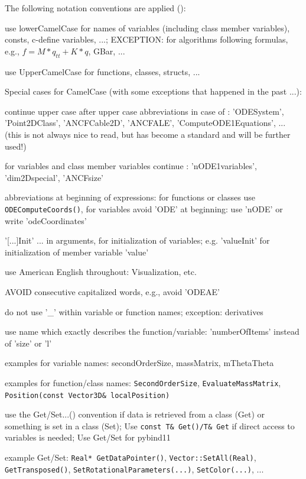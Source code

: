 %
The following notation conventions are applied ():
\bi
    \item use lowerCamelCase for names of variables (including class member variables), consts, c-define variables, ...; EXCEPTION: for algorithms following formulas, e.g., $f = M*q_{tt} + K*q$, GBar, ...
    \item use UpperCamelCase for functions, classes, structs, ...
    \item Special cases for CamelCase (with some exceptions that happened in the past ...): 
    \bi
    \item continue upper case after upper case abbreviations in case of : 'ODESystem', 'Point2DClass', 'ANCFCable2D', 'ANCFALE', 'ComputeODE1Equations', ... (this is not always nice to read, but has become a standard and will be further used!) 
    \item for variables and class member variables continue : 'nODE1variables', 'dim2Dspecial', 'ANCFsize'
    \item abbreviations at beginning of expressions: for functions or classes use \texttt{ODEComputeCoords()}, for variables avoid 'ODE' at beginning: use 'nODE' or write 'odeCoordinates'
    \ei
    \item '[...]Init' ... in arguments, for initialization of variables; e.g. 'valueInit' for initialization of member variable 'value'
    \item use American English throughout: Visualization, etc.
    \item AVOID consecutive capitalized words, e.g., avoid 'ODEAE'
    \item do not use '\_' within variable or function names; exception: derivatives
    \item use name which exactly describes the function/variable: 'numberOfItems' instead of 'size' or 'l'
    \item examples for variable names: secondOrderSize, massMatrix, mThetaTheta
    \item examples for function/class names: \texttt{SecondOrderSize}, \texttt{EvaluateMassMatrix}, \texttt{Position(const Vector3D\& localPosition)}
    \item use the Get/Set...() convention if data is retrieved from a class (Get) or something is set in a class (Set); Use \texttt{const T\& Get()/T\& Get} if direct access to variables is needed; Use Get/Set for pybind11
    \item example Get/Set: \texttt{Real* GetDataPointer()}, \texttt{Vector::SetAll(Real)}, \texttt{GetTransposed()}, \texttt{SetRotationalParameters(...)}, \texttt{SetColor(...)}, ...
